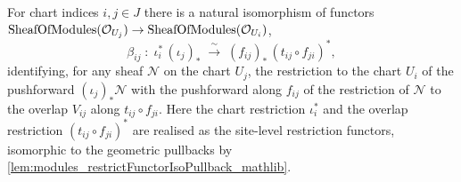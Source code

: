 \begin{lemma}\leanok
  \label{lem:glueOverlapBaseChangeIso}
  For chart indices \(i, j \in J\) there is a natural isomorphism of functors
  \(\mathrm{SheafOfModules}(\mathcal{O}_{U_j}) \to \mathrm{SheafOfModules}(\mathcal{O}_{U_i})\),
  \[
    \beta_{ij} \;:\;
      \iota_i^{*}\,(\iota_j)_{*}
        \;\xrightarrow{\ \sim\ }\;
      (f_{ij})_{*}\,(t_{ij} \circ f_{ji})^{*},
  \]
  identifying, for any sheaf \(\mathcal{N}\) on the chart \(U_j\), the restriction to
  the chart \(U_i\) of the pushforward \((\iota_j)_{*}\mathcal{N}\) with the
  pushforward along \(f_{ij}\) of the restriction of \(\mathcal{N}\) to the overlap
  \(V_{ij}\) along \(t_{ij} \circ f_{ji}\). Here the chart restriction \(\iota_i^{*}\)
  and the overlap restriction \((t_{ij} \circ f_{ji})^{*}\) are realised as the
  site-level restriction functors, isomorphic to the geometric pullbacks by
  \cref{lem:modules_restrictFunctorIsoPullback_mathlib}.
\end{lemma}
